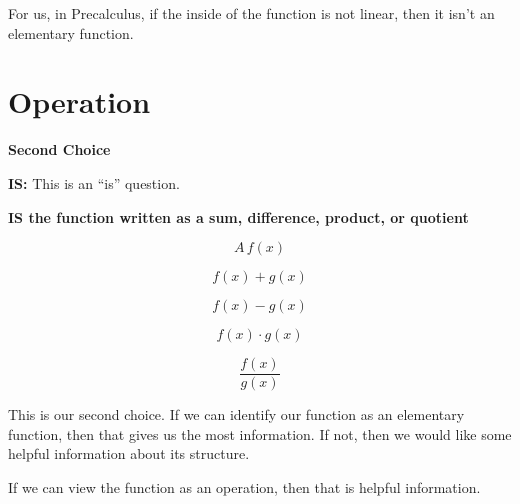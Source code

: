 \documentclass{ximera}
\begin{document}
For us, in Precalculus, if the inside of the function is not linear, then it isn't an elementary function. 







































\section*{Operation}

\textbf{\textcolor{purple!85!blue}{Second Choice}} 


\textbf{\textcolor{purple!70!blue}{IS:}}   This is an ``is'' question. 

\begin{center}
\textbf{\textcolor{red!80!black}{IS the function written as a sum, difference, product, or quotient}}

\end{center}




\[
A \, f(x) 
\]


\[
f(x) + g(x)
\]


\[
f(x) - g(x)
\]


\[
f(x) \cdot g(x)
\]


\[
\frac{f(x)}{g(x)}
\]





This is our second choice.  If we can identify our function as an elementary function, then that gives us the most information. If not, then we would like some helpful information about its structure. 



If we can view the function as an operation, then that is helpful information.
\end{document}
